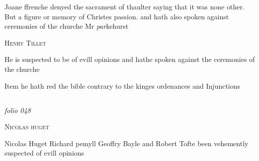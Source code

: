 \documentclass[12pt, a4paper]{book}
\begin{document}
               	
				\marginpar[\vspace{0.5cm}{\textcolor{Gray}{n}}]{}
			
               		
				\marginpar[\vspace{0.5cm}{\textcolor{Gray}{herecie}}]{}
			
               		
		\ifthenelse{\isodd{\thepage}}
		{\reversemarginpar}
		{\normalmarginpar}
		Joane ffrenche denyed the sacrament of thaulter
 saying that it was none other. But a figure
 or memory of Christes passion. and hath also
 spoken against ceremonies of the churche Mr \textit{par}kehurst
 

               
                  
				\begin{center}  {\scshape Henry Tillet}  \end{center}
			

		\ifthenelse{\isodd{\thepage}}
		{\reversemarginpar}
		{\normalmarginpar}
		He is suspected to be of evill opinions and hathe
 spoken against the ceremonies of the churche
 
		\ifthenelse{\isodd{\thepage}}
		{\reversemarginpar}
		{\normalmarginpar}
		Item he hath red the bible contrary to the kinges
 ordenances and Injunctions


               

\dotfill
					  \subsection*{}  \subsection*{}

\textit{folio 048}


               
                  
				\begin{center}  {\scshape Nicolas huget}  \end{center}
			
               	
		\ifthenelse{\isodd{\thepage}}
		{\reversemarginpar}
		{\normalmarginpar}
		Nicolas Huget Richard pemyll Geoffry Bayle
               		and Robert Tofte been vehemently suspected of
 evill opinions
 

            
            
\end{document}
